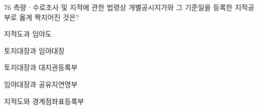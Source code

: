 \begin{question}{76}
측량ㆍ수로조사 및 지적에 관한 법령상 개별공시지가와 그 기준일을 등록한 지적공부로 옳게 짝지어진 것은?
\begin{choices}
  \item 지적도과 임야도 %
  \item 토지대장과 임야대장
  \item 토지대장과 대지권등록부
  \item 임야대장과 공유지연명부
  \item 지적도와 경계점좌표등록부
\end{choices}
\end{question}
